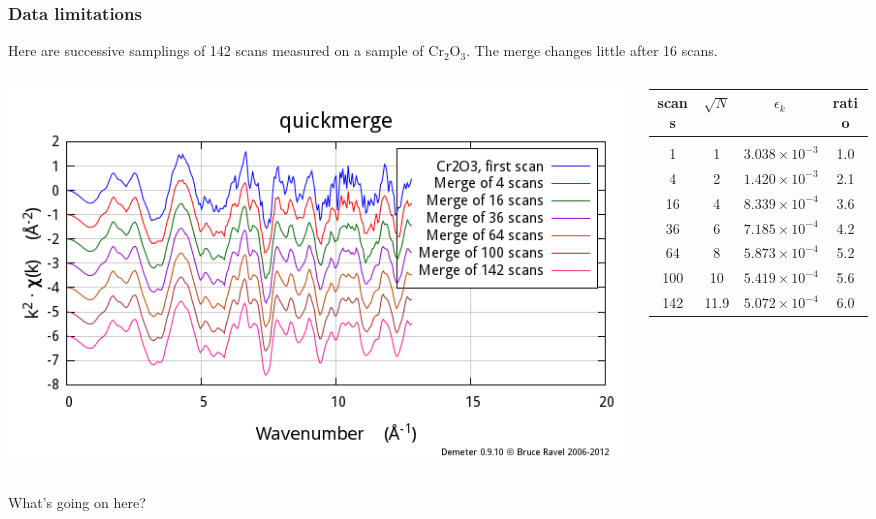 \documentclass[10pt, xcolor=x11names, compress]{beamer}
\begin{document}
\begin{frame}
  \frametitle{Data limitations}
  Here are successive samplings of 142 scans measured on a sample of
  Cr$_2$O$_3$.  The merge changes little after 16 scans.

  \bigskip

  \begin{columns}[T]
    \begin{column}{0.5\linewidth}
      \includegraphics[width=\linewidth]{images/cr2o3.png}
    \end{column}
    \begin{column}{0.5\linewidth}
      \small
      \begin{tabular}[h]{cccc}
        scans & $\sqrt{N}$ & $\epsilon_k$ & ratio \\
        \hline\\
        1   & 1  & $3.038\times 10^{-3}$ & 1.0 \\
        4   & 2  & $1.420\times 10^{-3}$ & 2.1 \\
        16  & 4  & $8.339\times 10^{-4}$ & 3.6 \\
        36  & 6  & $7.185\times 10^{-4}$ & 4.2 \\
        64  & 8  & $5.873\times 10^{-4}$ & 5.2 \\
        100 & 10 & $5.419\times 10^{-4}$ & 5.6 \\
        142 & 11.9 & $5.072\times 10^{-4}$ & 6.0
      \end{tabular}
    \end{column}
  \end{columns}

  \bigskip

  \begin{alertblock}{}
    \centering What's going on here?
  \end{alertblock}
\end{frame}
\end{document}
